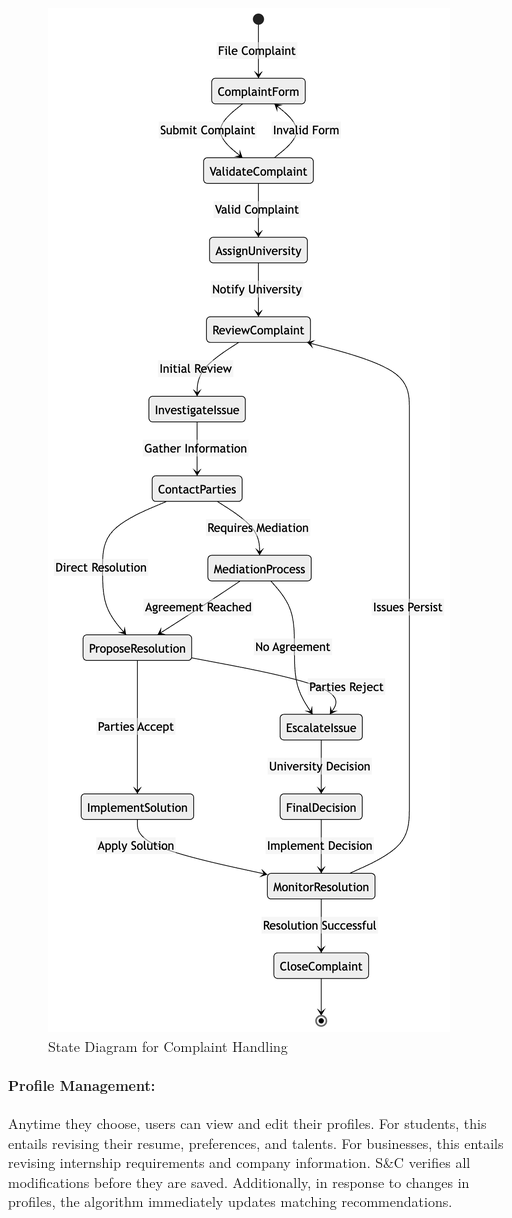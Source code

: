 \begin{figure}[H]
    \begin{center}
        \includegraphics[width=0.42\linewidth]{JhaBhatiaSharma/Images/State Diagrams/ComplaintFiling.png}
        \caption{State Diagram for Complaint Handling}
        \label{fig:complaintHandling}%
    \end{center}
\end{figure}

\paragraph{Profile Management:}
Anytime they choose, users can view and edit their profiles. For students, this entails revising their resume, preferences, and talents. For businesses, this entails revising internship requirements and company information. S\&C verifies all modifications before they are saved. Additionally, in response to changes in profiles, the algorithm immediately updates matching recommendations.

